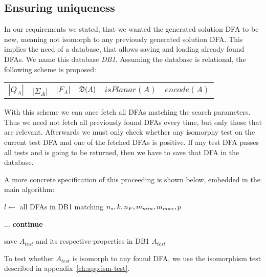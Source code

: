 \subsection{Ensuring uniqueness}

In our requirements we stated, that we wanted the generated solution DFA to be new, meaning not isomorph to any previously generated solution DFA. This implies the need of a database, that allows saving and loading already found DFAs. We name this database \emph{DB1}. Assuming the database is relational, the following scheme is proposed:
\begin{center}
	\begin{tabular}{c c c c c c}
	$|Q_A|$ & |$\Sigma_A$| & $|F_A|$ & $\mathfrak{D}(A)$ & $isPlanar(A)$ & $encode(A)$
	\end{tabular}
\end{center}
With this scheme we can once fetch all DFAs matching the search parameters. Thus we need not fetch all previously found DFAs every time, but only those that are relevant. Afterwards we must only check whether any isomorphy test on the current test DFA and one of the fetched DFAs is positive. If any test DFA passes all tests and is going to be returned, then we have to save that DFA in the database.

A more concrete specification of this proceeding is shown below, embedded in the main algorithm:
\vspace{0.2cm}
\begin{algorithmic}[1]
	
		\vspace{0.2cm}
	
		\State $l \gets$ all DFAs in DB1 matching ${n_s}, k, {n_F}, m_{min}, m_{max}, p$
		
		\vspace{0.2cm}
		
		
		\vspace{0.2cm}
		
			\State $\ldots$
				\State \textbf{continue}
			\EndIf
			
			\vspace{0.2cm}
			
			\State save $A_{test}$ and its respective properties in DB1
			\State\Return $A_{test}$
		\EndWhile
	\EndFunction
\end{algorithmic}
\vspace{0.2cm}
To test whether $A_{test}$ is isomorph to any found DFA, we use the isomorphism test described in appendix~\ref{ch:app:ism-test}.

